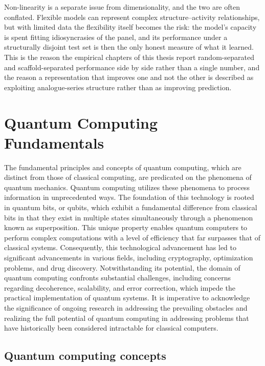 Non-linearity is a separate issue from dimensionality, and the two are often conflated. Flexible models can represent complex structure--activity relationships, but with limited data the flexibility itself becomes the risk: the model's capacity is spent fitting idiosyncrasies of the panel, and its performance under a structurally disjoint test set is then the only honest measure of what it learned. This is the reason the empirical chapters of this thesis report random-separated and scaffold-separated performance side by side rather than a single number, and the reason a representation that improves one and not the other is described as exploiting analogue-series structure rather than as improving prediction.

\section{Quantum Computing Fundamentals}
The fundamental principles and concepts of quantum computing, which are distinct from those of classical computing, are predicated on the phenomena of quantum mechanics. Quantum computing utilizes these phenomena to process information in unprecedented ways. The foundation of this technology is rooted in quantum bits, or qubits, which exhibit a fundamental difference from classical bits in that they exist in multiple states simultaneously through a phenomenon known as superposition. This unique property enables quantum computers to perform complex computations with a level of efficiency that far surpasses that of classical systems. Consequently, this technological advancement has led to significant advancements in various fields, including cryptography, optimization problems, and drug discovery. Notwithstanding its potential, the domain of quantum computing confronts substantial challenges, including concerns regarding decoherence, scalability, and error correction, which impede the practical implementation of quantum systems. It is imperative to acknowledge the significance of ongoing research in addressing the prevailing obstacles and realizing the full potential of quantum computing in addressing problems that have historically been considered intractable for classical computers.

\subsection{Quantum computing concepts}

